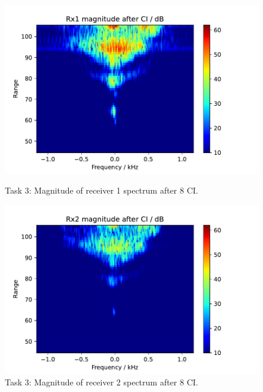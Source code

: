 \begin{figure}
    \centering
    \begin{minipage}{0.48\textwidth}
        \centering
        \includegraphics[width=\textwidth]{graphics/t3/t3-mag-rx1.pdf}
    \caption{Task 3: Magnitude of receiver 1 spectrum after 8 CI.}
    \label{fig:t3-mag-x1}
    \end{minipage}\hfill
    \begin{minipage}{0.48\textwidth}
        \centering
             \includegraphics[width=\textwidth]{graphics/t3/t3-mag-rx2.pdf}
    \caption{Task 3: Magnitude of receiver 2 spectrum after 8 CI.}
    \label{fig:t3-mag-rx2}
    \end{minipage}
\end{figure}

